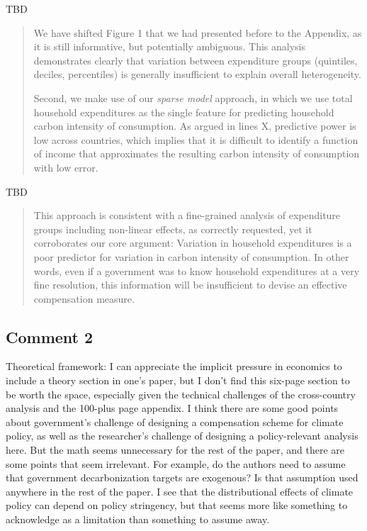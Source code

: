 \documentclass[11pt]{article}
\newenvironment{response}
{\begin{quote}\color{black}}
{\end{quote}}
\begin{document}
\begin{revisionbox}
    TBD
\end{revisionbox}

\begin{response}
We have shifted Figure 1 that we had presented before to the Appendix, as it is still informative, but potentially ambiguous. This analysis demonstrates clearly that variation between expenditure groups (quintiles, deciles, percentiles) is generally insufficient to explain overall heterogeneity.

Second, we make use of our \textit{sparse model} approach, in which we use total household expenditures as the single feature for predicting household carbon intensity of consumption. As argued in lines X, predictive power is low across countries, which implies that it is difficult to identify a function of income that approximates the resulting carbon intensity of consumption with low error.
\end{response}

\begin{revisionbox}
    TBD
\end{revisionbox}

\begin{response}
This approach is consistent with a fine-grained analysis of expenditure groups including non-linear effects, as correctly requested, yet it corroborates our core argument: Variation in household expenditures is a poor predictor for variation in carbon intensity of consumption. In other words, even if a government was to know household expenditures at a very fine resolution, this information will be insufficient to devise an effective compensation measure.
\end{response}

\subsection*{Comment 2}\label{comment_R1_2}

\begin{commentbox}
    Theoretical framework: I can appreciate the implicit pressure in economics to include a theory section in one's paper, but I don't find this six-page section to be worth the space, especially given the technical challenges of the cross-country analysis and the 100-plus page appendix. I think there are some good points about government's challenge of designing a compensation scheme for climate policy, as well as the researcher's challenge of designing a policy-relevant analysis here. But the math seems unnecessary for the rest of the paper, and there are some points that seem irrelevant. For example, do the authors need to assume that government decarbonization targets are exogenous? Is that assumption used anywhere in the rest of the paper. I see that the distributional effects of climate policy can depend on policy stringency, but that seems more like something to acknowledge as a limitation than something to assume away.
\end{commentbox}
\end{document}
